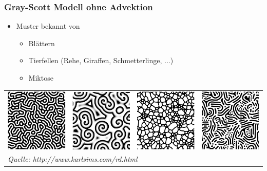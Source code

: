 \documentclass[12pt]{beamer}
\begin{document}
      \begin{frame}
      \frametitle{Gray-Scott Modell ohne Advektion}

      \begin{itemize}
	  \item Muster bekannt von
      \begin{itemize}
	  \item	Blättern
	  \item Tierfellen (Rehe, Giraffen, Schmetterlinge, ...)
	  \item Miktose
      \end{itemize}
      \end{itemize}
      \begin{tabular}{l}
	  \includegraphics[width=\textwidth,keepaspectratio]{Bilder/gs_scenarios.png} \\
	  \textit{Quelle: http://www.karlsims.com/rd.html} \\
      \end{tabular}

    \end{frame}
\end{document}
